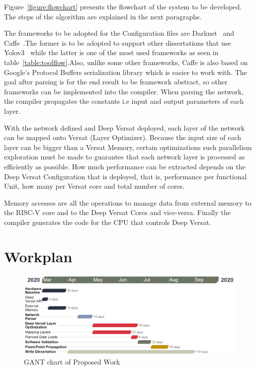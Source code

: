 Figure~\ref{figure:flowchart} presents the flowchart of the system to be developed. The steps
of the algorithm are explained in the next paragraphs.


The frameworks to be adopted for the Configuration files are Darknet~\cite{darknet} and Caffe~\cite{caffe}.The former is to be adopted
to support other dissertations that use Yolov3~\cite{yolov3} while the latter is one of the most used frameworks as seen in table~\ref{table:toolflow}.Also,
unlike some other frameworks, Caffe is also based on Google's Protocol Buffers serialization library which is easier to work with.
The goal after parsing is for the end result to be framework abstract, so other frameworks can be implemented into the compiler.
When parsing the network, the compiler propagates the constants i.e input and output parameters of each layer.

With the network defined and Deep Versat deployed, each layer of the network can be mapped onto Versat (Layer Optimizer). Because the input size of each layer
can be bigger than a Versat Memory, certain optimizations such parallelism exploration must be made to guarantee that each network layer is processed as efficiently as possible. 
How much performance can be extracted depends on the Deep Versat Configuration that is deployed, that is, performance per functional Unit, how many per Versat core and
total number of cores.

Memory accesses are all the operations to manage data from external memory to the RISC-V core and to the Deep Versat Cores and vice-versa.
Finally the compiler generates the code for the CPU that controls Deep Versat.
\newpage
\section{Workplan}


\begin{figure}[!htb]
    \centering
    \includegraphics[width=1\textwidth]{Figures/gant22.png}
    \caption{GANT chart of Proposed Work}
    \label{figure:gant}
\end{figure}

